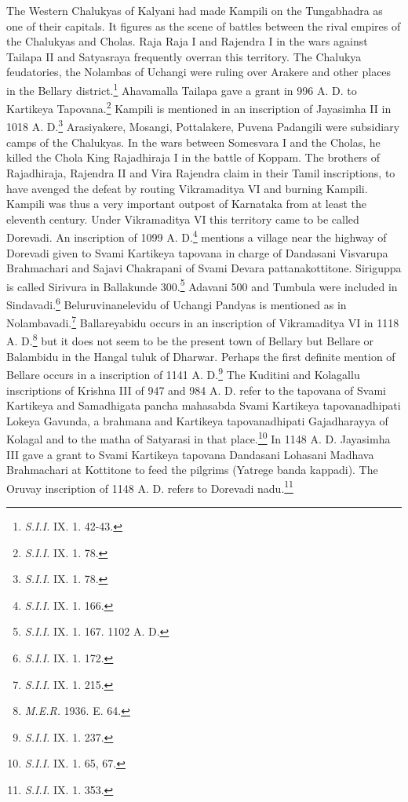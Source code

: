 \documentclass{book}
\begin{document}
The Western Chalukyas of Kalyani had made Kampili on the Tungabhadra as one of their capitals. It figures as the scene of battles between the rival empires of the Chalukyas and Cholas. Raja Raja I and Rajendra I in the wars against Tailapa II and Satyasraya frequently overran this territory. The Chalukya feudatories, the Nolambas of Uchangi were ruling over Arakere and other places in the Bellary district.\footnote[22]{{\em S.I.I.} IX. 1. 42-43.} Ahavamalla Tailapa gave a grant in 996 A. D. to Kartikeya Tapovana.\footnote[23]{{\em S.I.I.} IX. 1. 78.} Kampili is mentioned in an inscription of Jayasimha II in 1018 A. D.\footnote[24]{{\em S.I.I.} IX. 1. 78.} Arasiyakere, Mosangi, Pottalakere, Puvena Padangili were subsidiary camps of the Chalukyas. In the wars between Somesvara I and the Cholas, he killed the Chola King Rajadhiraja I in the battle of Koppam. The brothers of Rajadhiraja, Rajendra II and Vira Rajendra claim in their Tamil inscriptions, to have avenged the defeat by routing Vikramaditya VI and burning Kampili. Kampili was thus a very important outpost of Karnataka from at least the eleventh century. Under Vikramaditya VI this territory came to be called Dorevadi. An inscription of 1099 A. D.\footnote[25]{{\em S.I.I.} IX. 1. 166.} mentions a village near the highway of Dorevadi given to Svami Kartikeya tapovana in charge of Dandasani Visvarupa Brahmachari and Sajavi Chakrapani of Svami Devara pattanakottitone. Siriguppa is called Sirivura in Ballakunde 300.\footnote[26]{{\em S.I.I.} IX. 1. 167. 1102 A. D.} Adavani 500 and Tumbula were included in Sindavadi.\footnote[27]{{\em S.I.I.} IX. 1. 172.} Beluruvinanelevidu of Uchangi Pandyas is mentioned as in Nolambavadi.\footnote[28]{{\em S.I.I.} IX. 1. 215.} Ballareyabidu occurs in an inscription of Vikramaditya VI in 1118 A. D.\footnote[29]{{\em M.E.R.} 1936. E. 64.} but it does not seem to be the present town of Bellary but Bellare or Balambidu in the Hangal tuluk of Dharwar. Perhaps the first definite mention of Bellare occurs in a inscription of 1141 A. D.\footnote[30]{{\em S.I.I.} IX. 1. 237.} The Kuditini and Kolagallu inscriptions of Krishna III of 947 and 984 A. D. refer to the tapovana of Svami Kartikeya and Samadhigata pancha mahasabda Svami Kartikeya tapovanadhipati Lokeya Gavunda, a brahmana and Kartikeya tapovanadhipati Gajadharayya of Kolagal and to the matha of Satyarasi in that place.\footnote[31]{{\em S.I.I.} IX. 1. 65, 67.} In 1148 A. D. Jayasimha III gave a grant to Svami Kartikeya tapovana Dandasani Lohasani Madhava Brahmachari at Kottitone to feed the pilgrims ({Yatrege banda kappadi}). The Oruvay inscription of 1148 A. D. refers to Dorevadi nadu.\footnote[32]{{\em S.I.I.} IX. 1. 353.} 
\end{document}
